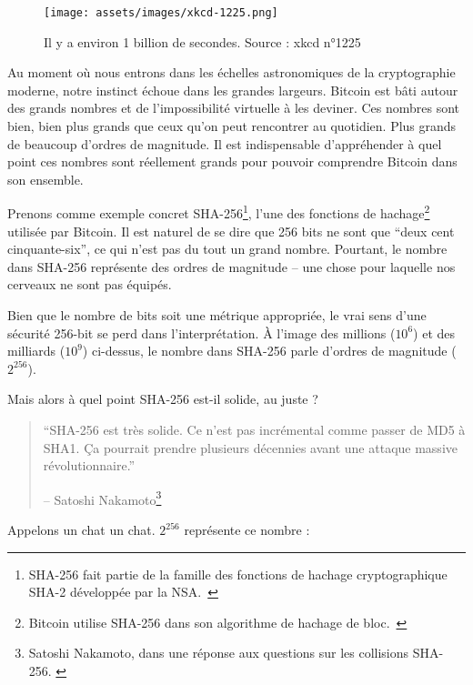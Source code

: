 \begin{figure}
  \texttt{[image: assets/images/xkcd-1225.png]}
  \caption{Il y a environ 1 billion de secondes. Source : xkcd n°1225}
  \label{fig:xkcd-1225}
\end{figure}

Au moment où nous entrons dans les échelles astronomiques de la cryptographie
moderne, notre instinct échoue dans les grandes largeurs. Bitcoin est bâti
autour des grands nombres et de l'impossibilité virtuelle à les deviner. Ces
nombres sont bien, bien plus grands que ceux qu'on peut rencontrer au quotidien.
Plus grands de beaucoup d'ordres de magnitude. Il est indispensable
d'appréhender à quel point ces nombres sont réellement grands pour pouvoir
comprendre Bitcoin dans son ensemble.

Prenons comme exemple concret SHA-256\footnote{SHA-256 fait partie de la famille
des fonctions de hachage cryptographique SHA-2 développée par la
NSA.~\cite{wiki:sha2}}, l'une des fonctions de hachage\footnote{Bitcoin utilise
SHA-256 dans son algorithme de hachage de bloc.~\cite{btcwiki:block-hashing}}
utilisée par Bitcoin. Il est naturel de se dire que 256 bits ne sont que
\enquote{deux cent cinquante-six}, ce qui n'est pas du tout un grand nombre.
Pourtant, le nombre dans SHA-256 représente des ordres de magnitude -- une chose
pour laquelle nos cerveaux ne sont pas équipés.

Bien que le nombre de bits soit une métrique appropriée, le vrai sens d'une
sécurité 256-bit se perd dans l'interprétation. À l'image des millions ($10^6$)
et des milliards ($10^9$) ci-dessus, le nombre dans SHA-256 parle d'ordres
de magnitude ($2^{256}$).

Mais alors à quel point SHA-256 est-il solide, au juste ?

\begin{quotation}\begin{samepage}
\enquote{SHA-256 est très solide. Ce n'est pas incrémental comme passer de MD5 à
SHA1. Ça pourrait prendre plusieurs décennies avant une attaque massive
révolutionnaire.}
\begin{flushright} -- Satoshi Nakamoto\footnote{Satoshi Nakamoto, dans une
réponse aux questions sur les collisions SHA-256. \cite{satoshi-sha256}}
\end{flushright}\end{samepage}\end{quotation}

Appelons un chat un chat. $2^{256}$ représente ce nombre :

